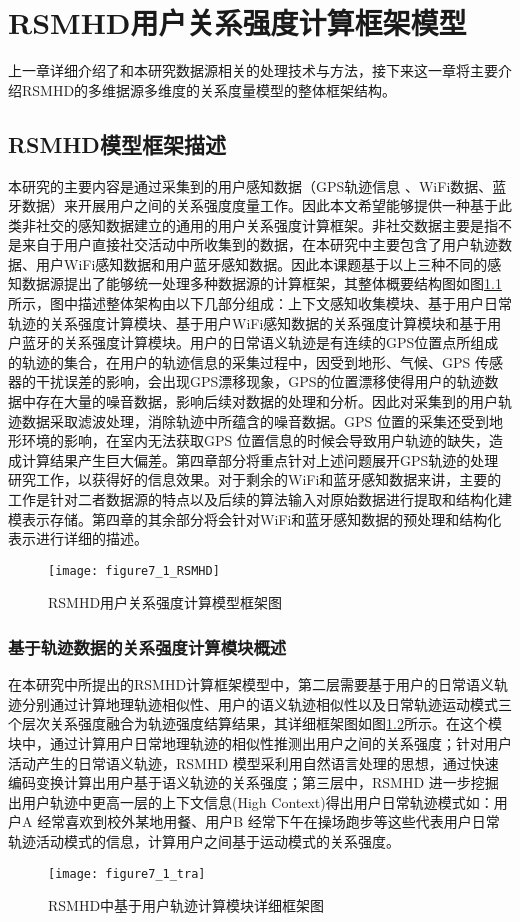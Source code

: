 \chapter{RSMHD用户关系强度计算框架模型}
\label{chap:chapter07}
上一章详细介绍了和本研究数据源相关的处理技术与方法，接下来这一章将主要介绍RSMHD的多维据源多维度的关系度量模型的整体框架结构。
\section{RSMHD模型框架描述}
\label{sec:section7-1}
本研究的主要内容是通过采集到的用户感知数据（GPS轨迹信息 、WiFi数据、蓝牙数据）来开展用户之间的关系强度度量工作。因此本文希望能够提供一种基于此类非社交的感知数据建立的通用的用户关系强度计算框架。非社交数据主要是指不是来自于用户直接社交活动中所收集到的数据，在本研究中主要包含了用户轨迹数据、用户WiFi感知数据和用户蓝牙感知数据。因此本课题基于以上三种不同的感知数据源提出了能够统一处理多种数据源的计算框架，其整体概要结构图如图\ref{fig:7_1}所示，图中描述整体架构由以下几部分组成：上下文感知收集模块、基于用户日常轨迹的关系强度计算模块、基于用户WiFi感知数据的关系强度计算模块和基于用户蓝牙的关系强度计算模块。用户的日常语义轨迹是有连续的GPS位置点所组成的轨迹的集合，在用户的轨迹信息的采集过程中，因受到地形、气候、GPS 传感器的干扰误差的影响，会出现GPS漂移现象，GPS的位置漂移使得用户的轨迹数据中存在大量的噪音数据，影响后续对数据的处理和分析。因此对采集到的用户轨迹数据采取滤波处理，消除轨迹中所蕴含的噪音数据。GPS 位置的采集还受到地形环境的影响，在室内无法获取GPS 位置信息的时候会导致用户轨迹的缺失，造成计算结果产生巨大偏差。第四章部分将重点针对上述问题展开GPS轨迹的处理研究工作，以获得好的信息效果。对于剩余的WiFi和蓝牙感知数据来讲，主要的工作是针对二者数据源的特点以及后续的算法输入对原始数据进行提取和结构化建模表示存储。第四章的其余部分将会针对WiFi和蓝牙感知数据的预处理和结构化表示进行详细的描述。
\begin{figure}[htp]
\centering
\texttt{[image: figure7\_1\_RSMHD]}
\caption{RSMHD用户关系强度计算模型框架图}
\label{fig:7_1}
\end{figure}
\subsection{基于轨迹数据的关系强度计算模块概述}
在本研究中所提出的RSMHD计算框架模型中，第二层需要基于用户的日常语义轨迹分别通过计算地理轨迹相似性、用户的语义轨迹相似性以及日常轨迹运动模式三个层次关系强度融合为轨迹强度结算结果，其详细框架图如图\ref{fig:7_1_tra}所示。在这个模块中，通过计算用户日常地理轨迹的相似性推测出用户之间的关系强度；针对用户活动产生的日常语义轨迹，RSMHD 模型采利用自然语言处理的思想，通过快速编码变换计算出用户基于语义轨迹的关系强度；第三层中，RSMHD 进一步挖掘出用户轨迹中更高一层的上下文信息(High Context)得出用户日常轨迹模式如：用户A 经常喜欢到校外某地用餐、用户B 经常下午在操场跑步等这些代表用户日常轨迹活动模式的信息，计算用户之间基于运动模式的关系强度。
\begin{figure}[htp]
\centering
\texttt{[image: figure7\_1\_tra]}
\caption{RSMHD中基于用户轨迹计算模块详细框架图}
\label{fig:7_1_tra}
\end{figure}
